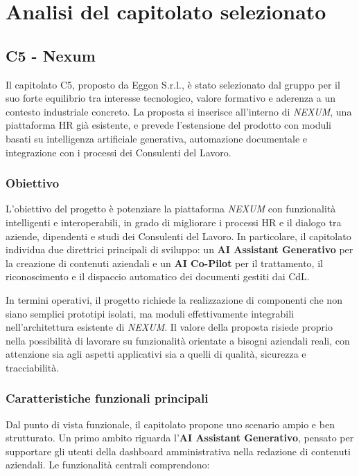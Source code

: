\documentclass[a4paper,12pt]{article}
\begin{document}
\section{Analisi del capitolato selezionato}
\subsection{C5 - Nexum}

Il capitolato C5, proposto da Eggon S.r.l., è stato selezionato dal gruppo per il suo forte equilibrio tra interesse tecnologico, valore formativo e aderenza a un contesto industriale concreto. La proposta si inserisce all'interno di \textit{NEXUM}, una piattaforma HR già esistente, e prevede l'estensione del prodotto con moduli basati su intelligenza artificiale generativa, automazione documentale e integrazione con i processi dei Consulenti del Lavoro.

\subsubsection{Obiettivo}

L'obiettivo del progetto è potenziare la piattaforma \textit{NEXUM} con funzionalità intelligenti e interoperabili, in grado di migliorare i processi HR e il dialogo tra aziende, dipendenti e studi dei Consulenti del Lavoro. In particolare, il capitolato individua due direttrici principali di sviluppo: un \textbf{AI Assistant Generativo} per la creazione di contenuti aziendali e un \textbf{AI Co-Pilot} per il trattamento, il riconoscimento e il dispaccio automatico dei documenti gestiti dai CdL.

In termini operativi, il progetto richiede la realizzazione di componenti che non siano semplici prototipi isolati, ma moduli effettivamente integrabili nell'architettura esistente di \textit{NEXUM}. Il valore della proposta risiede proprio nella possibilità di lavorare su funzionalità orientate a bisogni aziendali reali, con attenzione sia agli aspetti applicativi sia a quelli di qualità, sicurezza e tracciabilità.

\subsubsection{Caratteristiche funzionali principali}

Dal punto di vista funzionale, il capitolato propone uno scenario ampio e ben strutturato. Un primo ambito riguarda l'\textbf{AI Assistant Generativo}, pensato per supportare gli utenti della dashboard amministrativa nella redazione di contenuti aziendali. Le funzionalità centrali comprendono:
\end{document}

